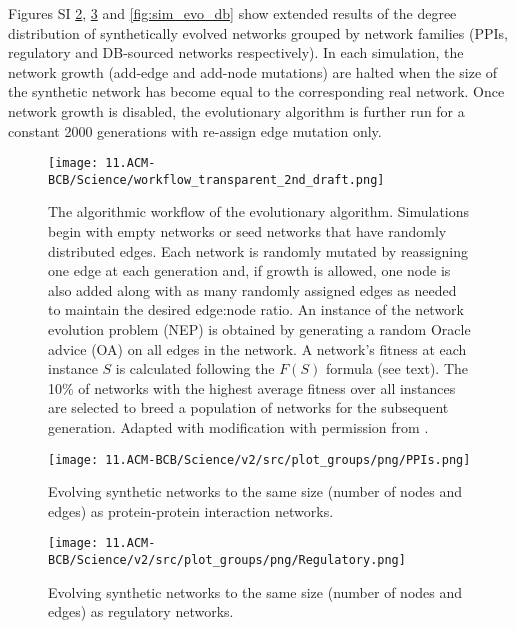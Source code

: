     Figures SI \ref{fig:sim_evo_ppi}, \ref{fig:sim_evo_reg} and \ref{fig:sim_evo_db} show extended results of the degree distribution of synthetically evolved networks grouped by network families (PPIs, regulatory and DB-sourced networks respectively). In each simulation, the network growth (add-edge and add-node mutations) are halted when the size of the synthetic network has become equal to the corresponding real network. Once network growth is disabled, the evolutionary algorithm is further run for a constant 2000 generations with re-assign edge mutation only.


    \begin{figure}[H]
        \centering
        \texttt{[image: 11.ACM-BCB/Science/workflow\_transparent\_2nd\_draft.png]} %
                \caption{The algorithmic workflow of the evolutionary algorithm. Simulations begin with empty networks or seed networks that have randomly distributed edges. Each network is randomly mutated by reassigning one edge at each generation and, if growth is allowed, one node is also added along with as many randomly assigned edges as needed to maintain the desired edge:node ratio. An instance of the network evolution problem (NEP) is obtained by generating a random Oracle advice (OA) on all edges in the network. A network's fitness at each instance $S$ is calculated following the $F(S)$ formula (see text). The 10\% of networks with the highest average fitness over all instances are selected to breed a population of networks for the subsequent generation. Adapted with modification with permission from  \cite{atiia_computational_2017-1}.
                }
        \label{sup-workflow}
     \end{figure}





    	\begin{figure}[H]%
    			\centering
    					\texttt{[image: 11.ACM-BCB/Science/v2/src/plot\_groups/png/PPIs.png]}
    					\caption
                            {
                                Evolving synthetic networks to the same size (number of nodes and edges) as protein-protein interaction networks.
                            }
    					\label{fig:sim_evo_ppi}
    	\end{figure}

    	\begin{figure}[H]%
    			\centering
    					\texttt{[image: 11.ACM-BCB/Science/v2/src/plot\_groups/png/Regulatory.png]}
    					\caption
                            {
                                Evolving synthetic networks to the same size (number of nodes and edges)  as regulatory networks.
                            }
    					\label{fig:sim_evo_reg}
    	\end{figure}

